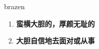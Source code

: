 
\begin{frame}
{\huge brazen}
\begin{center}
\begin{enumerate}\Large
  \item \textbf{蛮横大胆的，厚颜无耻的}
  \item \textbf{大胆自信地去面对或从事}
\end{enumerate}
\end{center}
\end{frame}
